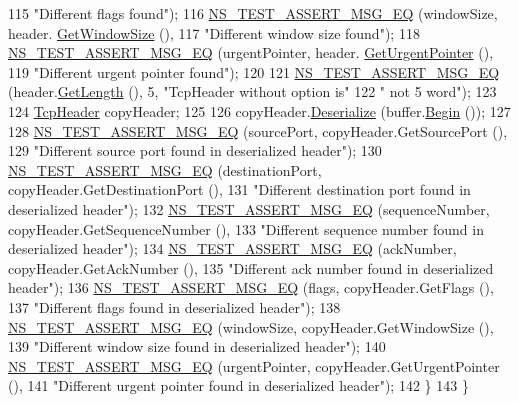 \begin{DoxyCode}
115                              \textcolor{stringliteral}{"Different flags found"});
116       \hyperlink{group__testing_ga2a9d78cffb3db8e867c35fff0b698cf5}{NS\_TEST\_ASSERT\_MSG\_EQ} (windowSize, header.
      \hyperlink{classns3_1_1TcpHeader_aa6adcd54e5b13941acdf6328cecc9b29}{GetWindowSize} (),
117                              \textcolor{stringliteral}{"Different window size found"});
118       \hyperlink{group__testing_ga2a9d78cffb3db8e867c35fff0b698cf5}{NS\_TEST\_ASSERT\_MSG\_EQ} (urgentPointer, header.
      \hyperlink{classns3_1_1TcpHeader_a0ab999506e0654e327abfcf66740cc5c}{GetUrgentPointer} (),
119                              \textcolor{stringliteral}{"Different urgent pointer found"});
120 
121       \hyperlink{group__testing_ga2a9d78cffb3db8e867c35fff0b698cf5}{NS\_TEST\_ASSERT\_MSG\_EQ} (header.\hyperlink{classns3_1_1TcpHeader_a957928d2dd1108dc1ef8c38daecdcf62}{GetLength} (), 5, \textcolor{stringliteral}{"TcpHeader without
       option is"}
122                              \textcolor{stringliteral}{" not 5 word"});
123 
124       \hyperlink{classns3_1_1TcpHeader}{TcpHeader} copyHeader;
125 
126       copyHeader.\hyperlink{classns3_1_1TcpHeader_ac9ebbec6f00c4d7d040c1d68dbe8c793}{Deserialize} (buffer.\hyperlink{classns3_1_1Buffer_a893d4bf50df13e730b6cd0fda91b967f}{Begin} ());
127 
128       \hyperlink{group__testing_ga2a9d78cffb3db8e867c35fff0b698cf5}{NS\_TEST\_ASSERT\_MSG\_EQ} (sourcePort, copyHeader.GetSourcePort (),
129                              \textcolor{stringliteral}{"Different source port found in deserialized header"});
130       \hyperlink{group__testing_ga2a9d78cffb3db8e867c35fff0b698cf5}{NS\_TEST\_ASSERT\_MSG\_EQ} (destinationPort, copyHeader.GetDestinationPort (),
131                              \textcolor{stringliteral}{"Different destination port found in deserialized header"});
132       \hyperlink{group__testing_ga2a9d78cffb3db8e867c35fff0b698cf5}{NS\_TEST\_ASSERT\_MSG\_EQ} (sequenceNumber, copyHeader.GetSequenceNumber (),
133                              \textcolor{stringliteral}{"Different sequence number found in deserialized header"});
134       \hyperlink{group__testing_ga2a9d78cffb3db8e867c35fff0b698cf5}{NS\_TEST\_ASSERT\_MSG\_EQ} (ackNumber, copyHeader.GetAckNumber (),
135                              \textcolor{stringliteral}{"Different ack number found in deserialized header"});
136       \hyperlink{group__testing_ga2a9d78cffb3db8e867c35fff0b698cf5}{NS\_TEST\_ASSERT\_MSG\_EQ} (flags, copyHeader.GetFlags (),
137                              \textcolor{stringliteral}{"Different flags found in deserialized header"});
138       \hyperlink{group__testing_ga2a9d78cffb3db8e867c35fff0b698cf5}{NS\_TEST\_ASSERT\_MSG\_EQ} (windowSize, copyHeader.GetWindowSize (),
139                              \textcolor{stringliteral}{"Different window size found in deserialized header"});
140       \hyperlink{group__testing_ga2a9d78cffb3db8e867c35fff0b698cf5}{NS\_TEST\_ASSERT\_MSG\_EQ} (urgentPointer, copyHeader.GetUrgentPointer (),
141                              \textcolor{stringliteral}{"Different urgent pointer found in deserialized header"});
142     \}
143 \}
\end{DoxyCode}


